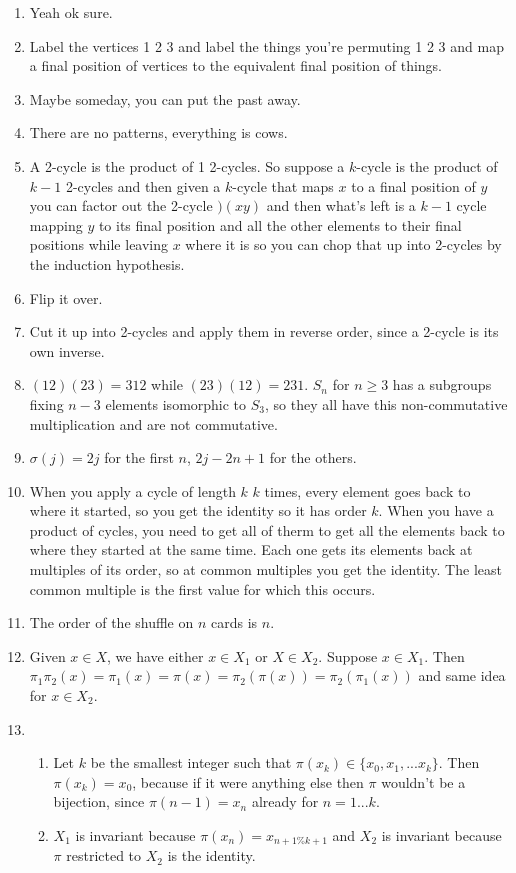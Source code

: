 \documentclass[11pt, oneside]{article}   	%
\newcommand{\be}{\begin{enumerate}}
\newcommand{\ee}{\end{enumerate}}
\begin{document}
\be
\item Yeah ok sure.
\item Label the vertices 1 2 3 and label the things you're permuting 1 2 3 and map a final position of vertices to the equivalent final position of things.
\item Maybe someday, you can put the past away.
\item There are no patterns, everything is cows.
\item A 2-cycle is the product of 1 2-cycles. So suppose a $k$-cycle is the product of $k-1$ 2-cycles and then given a $k$-cycle that maps $x$ to a final position of $y$ you can factor out the 2-cycle $)(x y)$ and then what's left is a $k-1$ cycle mapping $y$ to its final position and all the other elements to their final positions while leaving $x$ where it is so you can chop that up into 2-cycles by the induction hypothesis.
\item Flip it over.
\item Cut it up into 2-cycles and apply them in reverse order, since a 2-cycle is its own inverse.
\item $(1 2) (2 3) = 312$ while $(2 3) (1 2) = 231$. $S_n$ for $n\ge 3$ has a subgroups fixing $n-3$ elements isomorphic to $S_3$, so they all have this non-commutative multiplication and are not commutative.
\item $\sigma(j) = 2j$ for the first $n$, $2j -2n + 1$ for the others.
\item When you apply a cycle of length $k$ $k$ times, every element goes back to where it started, so you get the identity so it has order $k$. When you have a product of cycles, you need to get all of therm to get all the elements back to where they started at the same time. Each one gets its elements back at multiples of its order, so at common multiples you get the identity. The least common multiple is the first value for which this occurs.
\item The order of the shuffle on $n$ cards is $n$.
\item Given $x \in X$, we have either $x\in X_1$ or $X \in X_2$. Suppose $x \in X_1$. Then $\pi_1\pi_2(x) = \pi_1(x) = \pi(x) = \pi_2(\pi(x)) = \pi_2(\pi_1(x))$ and same idea for $x \in X_2$.
\item \be
\item Let $k$ be the smallest integer such that $\pi(x_k) \in \{x_0, x_1, ... x_k\}$. Then $\pi(x_k) = x_0$, because if it were anything else then $\pi$ wouldn't be a bijection, since $\pi(n-1) = x_n$ already for $n=1...k$.
\item $X_1$ is invariant because $\pi(x_n) = x_{n + 1 \% k + 1}$ and $X_2$ is invariant because $\pi$ restricted to $X_2$ is the identity.
\ee
\ee
\end{document}
